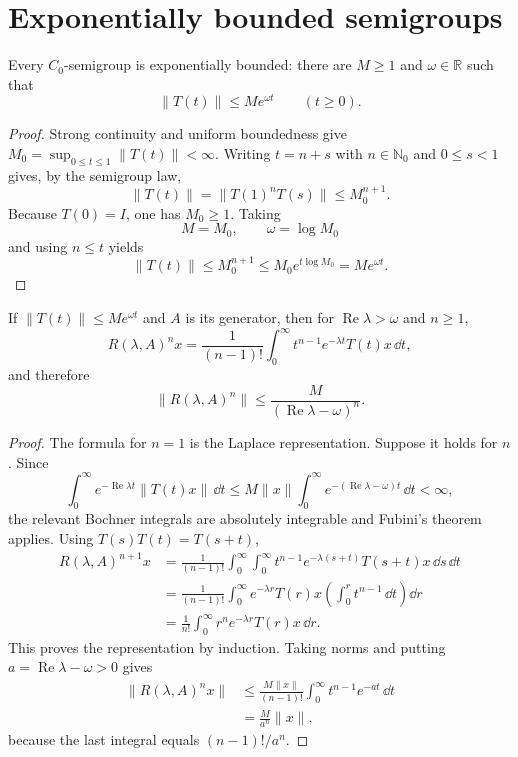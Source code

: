\section{Exponentially bounded semigroups}

\begin{notelemma}
Every $C_0$-semigroup is exponentially bounded: there are $M\ge1$ and
$\omega\in\mathbb R$ such that
\[
  \|T(t)\|\le Me^{\omega t}
  \qquad(t\ge0).
\]
\end{notelemma}

\begin{proof}
Strong continuity and uniform boundedness give
$M_0=\sup_{0\le t\le1}\|T(t)\|<\infty$.  Writing $t=n+s$ with
$n\in\mathbb N_0$ and $0\le s<1$ gives, by the semigroup law,
\[
  \|T(t)\|
  =\|T(1)^nT(s)\|
  \le M_0^{n+1}.
\]
Because $T(0)=I$, one has $M_0\ge1$.  Taking
\[
  M=M_0,
  \qquad
  \omega=\log M_0
\]
and using $n\le t$ yields
\[
  \|T(t)\|\le M_0^{n+1}
  \le M_0e^{t\log M_0}=Me^{\omega t}.
\]
\end{proof}

\begin{notelemma}
If $\|T(t)\|\le Me^{\omega t}$ and $A$ is its generator, then for
$\operatorname{Re}\lambda>\omega$ and $n\ge1$,
\[
  R(\lambda,A)^n x
  =\frac1{(n-1)!}
    \int_0^\infty t^{n-1}e^{-\lambda t}T(t)x\,\dd t,
\]
and therefore
\[
  \|R(\lambda,A)^n\|
  \le\frac{M}{(\operatorname{Re}\lambda-\omega)^n}.
\]
\end{notelemma}

\begin{proof}
The formula for $n=1$ is the Laplace representation.  Suppose it holds for
$n$.  Since
\[
  \int_0^\infty e^{-\operatorname{Re}\lambda t}\|T(t)x\|\,\dd t
  \le M\|x\|\int_0^\infty
       e^{-(\operatorname{Re}\lambda-\omega)t}\,\dd t<\infty,
\]
the relevant Bochner integrals are absolutely integrable and Fubini's theorem
applies.  Using $T(s)T(t)=T(s+t)$,
\[
\begin{aligned}
 R(\lambda,A)^{n+1}x
 &=\frac1{(n-1)!}
   \int_0^\infty\int_0^\infty
      t^{n-1}e^{-\lambda(s+t)}T(s+t)x\,\dd s\,\dd t\\
 &=\frac1{(n-1)!}
   \int_0^\infty e^{-\lambda r}T(r)x
      \left(\int_0^r t^{n-1}\,\dd t\right)\dd r\\
 &=\frac1{n!}\int_0^\infty
      r^ne^{-\lambda r}T(r)x\,\dd r.
\end{aligned}
\]
This proves the representation by induction.  Taking norms and putting
$a=\operatorname{Re}\lambda-\omega>0$ gives
\[
\begin{aligned}
  \|R(\lambda,A)^nx\|
  &\le\frac{M\|x\|}{(n-1)!}
       \int_0^\infty t^{n-1}e^{-at}\,\dd t\\
  &=\frac{M}{a^n}\|x\|,
\end{aligned}
\]
because the last integral equals $(n-1)!/a^n$.
\end{proof}

